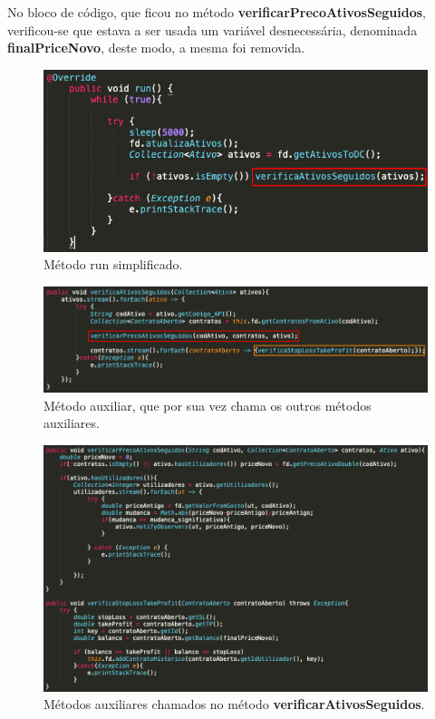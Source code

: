 \hspace{5mm} No bloco de código, que ficou no método \textbf{verificarPrecoAtivosSeguidos}, verificou-se que estava a ser usada um variável desnecessária, denominada \textbf{finalPriceNovo}, deste modo, a mesma foi removida.

\begin{figure}[H]
	\centering
	\includegraphics[scale=0.65]{images/bloaters/long-method/b2-2-1.png}
	\caption{Método run\(\) simplificado.}
	\label{img:pag}
\end{figure}

\begin{figure}[H]
	\centering
	\includegraphics[scale=0.55]{images/bloaters/long-method/b2-2-2.png}
	\caption{Método auxiliar, que por sua vez chama os outros métodos auxiliares.}
	\label{img:pag}
\end{figure}

\begin{figure}[H]
	\centering
	\includegraphics[scale=0.45]{images/bloaters/long-method/b2-2-3.png}
	\caption{Métodos auxiliares chamados no método \textbf{verificarAtivosSeguidos}.}
	\label{img:pag}
\end{figure}

